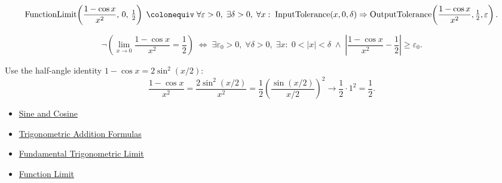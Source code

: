 \begin{remark*}
\[
  \operatorname{FunctionLimit}\!\left(\frac{1-\cos x}{x^2},\,0,\,\tfrac{1}{2}\right)
  \;\colonequiv\;
  \forall\varepsilon>0,\;\exists\delta>0,\;\forall x:\;
  \operatorname{InputTolerance}(x,0,\delta)
  \Rightarrow
  \operatorname{OutputTolerance}\!\left(\frac{1-\cos x}{x^2},\tfrac{1}{2},\varepsilon\right).
\]
\end{remark*}

\begin{remark*}
\[
  \neg\left(\lim_{x\to 0}\frac{1-\cos x}{x^2}=\frac{1}{2}\right)
  \;\iff\;
  \exists\varepsilon_0>0,\;\forall\delta>0,\;\exists x:\;
  0<|x|<\delta \;\wedge\;
  \left|\frac{1-\cos x}{x^2}-\frac{1}{2}\right|\geq\varepsilon_0.
\]
\end{remark*}

\begin{remark*}
Use the half-angle identity $1 - \cos x = 2\sin^2(x/2)$:
\[
  \frac{1 - \cos x}{x^2}
  = \frac{2\sin^2(x/2)}{x^2}
  = \frac{1}{2}\left(\frac{\sin(x/2)}{x/2}\right)^2
  \to \frac{1}{2} \cdot 1^2 = \frac{1}{2}.
\]
\end{remark*}

\begin{dependencies}
\begin{itemize}
  \item \hyperref[def:sine-cosine]{Sine and Cosine}
  \item \hyperref[prop:trig-addition-formulas]{Trigonometric Addition Formulas}
  \item \hyperref[thm:fundamental-trig-limit]{Fundamental Trigonometric Limit}
  \item \hyperref[def:limit-function]{Function Limit}
\end{itemize}
\end{dependencies}
